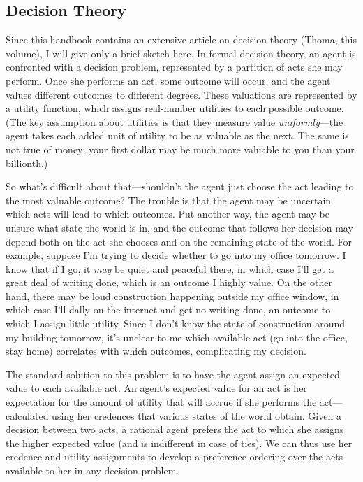 \subsection{Decision Theory} \label{ss:decision}
Since this handbook contains an extensive article on decision theory (Thoma, this volume), I will give only a brief sketch here. In formal decision theory, an agent is confronted with a decision problem, represented by a partition of acts she may perform. Once she performs an act, some outcome will occur, and the agent values different outcomes to different degrees. These valuations are represented by a utility function, which assigns real-number utilities to each possible outcome. (The key assumption about utilities is that they measure value \emph{uniformly}---the agent takes each added unit of utility to be as valuable as the next. The same is not true of money; your first dollar may be much more valuable to you than your billionth.)  

So what's difficult about that---shouldn't the agent just choose the act leading to the most valuable outcome? The trouble is that the agent may be uncertain which acts will lead to which outcomes. Put another way, the agent may be unsure what state the world is in, and the outcome that follows her decision may depend both on the act she chooses and on the remaining state of the world. For example, suppose I'm trying to decide whether to go into my office tomorrow. I know that if I go, it \emph{may} be quiet and peaceful there, in which case I'll get a great deal of writing done, which is an outcome I highly value. On the other hand, there may be loud construction happening outside my office window, in which case I'll dally on the internet and get no writing done, an outcome to which I assign little utility. Since I don't know the state of construction around my building tomorrow, it's unclear to me which available act (go into the office, stay home) correlates with which outcomes, complicating my decision.

The standard solution to this problem is to have the agent assign an expected value to each available act. An agent's expected value for an act is her expectation for the amount of utility that will accrue if she performs the act---calculated using her credences that various states of the world obtain. Given a decision between two acts, a rational agent prefers the act to which she assigns the higher expected value (and is indifferent in case of ties). We can thus use her credence and utility assignments to develop a preference ordering over the acts available to her in any decision problem.


